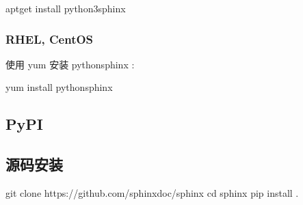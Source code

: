 \documentclass[a4paper,10pt,english]{sphinxmanual}
\begin{document}
\begin{sphinxVerbatim}[commandchars=\\\{\}]
\PYGZdl{} apt\PYGZhy{}get install python3\PYGZhy{}sphinx
\end{sphinxVerbatim}


\subsubsection{RHEL, CentOS}
\label{\detokenize{sphinx_intro:rhel-centos}}
\sphinxAtStartPar
使用 yum 安装 python\sphinxhyphen{}sphinx :

\begin{sphinxVerbatim}[commandchars=\\\{\}]
\PYGZdl{} yum install python\PYGZhy{}sphinx
\end{sphinxVerbatim}


\subsection{PyPI}
\label{\detokenize{sphinx_intro:pypi}}
\begin{sphinxVerbatim}[commandchars=\\\{\}]
   
\end{sphinxVerbatim}


\subsection{源码安装}
\label{\detokenize{sphinx_intro:id3}}
\begin{sphinxVerbatim}[commandchars=\\\{\}]
git clone https://github.com/sphinx\PYGZhy{}doc/sphinx
\PYGZdl{} cd sphinx
\PYGZdl{} pip install .
\end{sphinxVerbatim}
\end{document}
